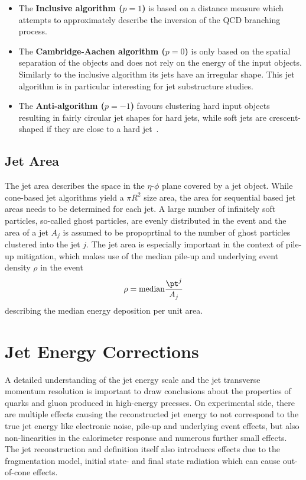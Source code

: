 \begin{itemize}
    \item The \textbf{Inclusive \kt algorithm ($p=1$)} is based on a \ptsq
        distance measure which attempts to approximately describe the inversion
        of the QCD branching process.
    \item The \textbf{Cambridge-Aachen algorithm ($p=0$)} is only based on the
        spatial separation of the objects and does not rely on the energy of
        the input objects. Similarly to the inclusive \kt algorithm its jets
        have an irregular shape. This jet algorithm is in particular interesting
        for jet substructure studies.
    \item The \textbf{Anti-\kt algorithm ($p=-1$)} favours clustering hard input
        objects resulting in fairly circular jet shapes for hard jets, while
        soft jets are crescent-shaped if they are close to a hard jet~\cite{Cacciari:2008gp}.
\end{itemize}

\subsection{Jet Area}

The jet area describes the space in the $\eta$-$\phi$ plane covered by a jet
object. While cone-based jet algorithms yield a $\pi R^2$ size area, the area
for sequential based jet areas needs to be determined for each jet. A large
number of infinitely soft particles, so-called ghost particles, are evenly
distributed in the event and the area of a jet $A_j$ is assumed to be propoprtinal to the
number of ghost particles clustered into the jet $j$. The jet area is
especially important in the context of pile-up mitigation, which makes use of
the median pile-up and underlying event \pt density $\rho$ in the event 
\begin{equation}
    \rho = \text{median} \frac{\pt^j}{A_j}
\end{equation}
describing the median energy deposition per unit area.

\section{Jet Energy Corrections}

A detailed understanding of the jet energy scale and the jet transverse momentum
resolution is important to draw conclusions about the properties of quarks and
gluon produced in high-energy prcesses. On experimental side, there are multiple
effects causing the reconstructed jet energy to not correspond to the true jet
energy like electronic noise, pile-up and underlying event effects, but also
non-linearities in the calorimeter response and numerous further small effects.
The jet reconstruction and definition itself also introduces effects due to the
fragmentation model, initial state- and final state radiation which can cause
out-of-cone effects.

